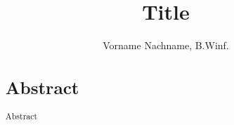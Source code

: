 \documentclass[bibtotocnumbered,titlepage]{scrartcl}
\title{Title}
\author{Vorname Nachname, B.Winf.}
\date{}
\begin{document}
\renewcommand{\figurename}{Abb.}
\renewcommand{\tablename}{Tab.}

\maketitle

\pagebreak
\begingroup
\begin{absolutelyNoPageBreak}
\begin{abstract}
	\section*{Abstract}
	Abstract
	
\end{abstract}

\end{absolutelyNoPageBreak}
\endgroup
\pagebreak 
\tableofcontents
\pagebreak 









\end{document}
